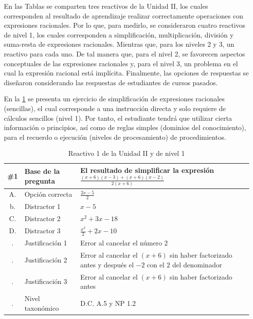 \documentclass[spanish]{textolivre}
\begin{document}
En las Tablas se comparten tres reactivos de la Unidad II, los cuales corresponden al resultado de aprendizaje realizar correctamente operaciones con expresiones racionales. Por lo que, para medirlo, se consideraron cuatro reactivos de nivel 1, los cuales corresponden a simplificación, multiplicación, división y suma-resta de expresiones racionales. Mientras que, para los niveles 2 y 3, un reactivo para cada uno. De tal manera que, para el nivel 2, se favorecen aspectos conceptuales de las expresiones racionales y, para el nivel 3, un problema en el cual la expresión racional está implícita. Finalmente, las opciones de respuestas se diseñaron considerando las respuestas de estudiantes de cursos pasados.

En la \cref{tbl02} se presenta un ejercicio de simplificación de expresiones racionales (sencillas), el cual corresponde a una instrucción directa y solo requiere de cálculos sencillos (nivel 1). Por tanto, el estudiante tendrá que utilizar cierta información o principios, así como de reglas simples (dominios del conocimiento), para el recuerdo o ejecución (niveles de procesamiento) de procedimientos.

\begin{table}[h!]
\caption{Reactivo 1 de la Unidad II y de nivel 1} %
\centering %
\begin{tabular} { c p{4cm} p{9cm} } %
\hline %
\#1 & Base de la pregunta &El resultado de simplificar la expresión$\frac{(x+6)(x-3)+(x+6)(x-2)}{2(x+6)}$ \\ [0.4ex] %
\hline %
A.  & Opción correcta &$\frac{2x-5}{2}$\\%
b. & Distractor 1 & $x-5$ \\
C. & Distractor 2 & $x^2+3x-18$\\
D. & Distractor 3  & $\frac{x^2}{2}+2x-10$\\
. & Justificación 1 & Error al cancelar el número $2$\\
. & Justificación 2 & Error al cancelar el $(x+6)$ sin haber factorizado antes y después el $-2$ con el $2$ del denominador\\
. & Justificación 3 & Error al cancelar el $(x+6)$ sin haber factorizado antes\\
. & Nivel taxonómico & D.C. A.5 y NP 1.2\\
\hline
\end{tabular}
\label{tbl02} %
\end{table}
\end{document}
